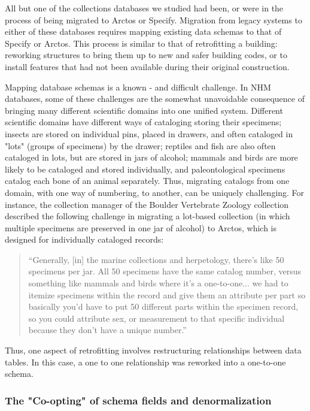 All but one of the collections databases we studied had been, or were in the process of being migrated to Arctos or Specify. Migration from legacy systems to either of these databases requires mapping existing data schemas to that of Specify or Arctos. This process is similar to that of retrofitting a building: reworking structures to bring them up to new and safer building codes, or to install features that had not been available during their original construction. 

Mapping database schemas is a known - and difficult challenge. In NHM databases, some of these challenges are the somewhat unavoidable consequence of bringing many different scientific domains into one unified system. Different scientific domains have different ways of cataloging storing their specimens; insects are stored on individual pins, placed in drawers, and often cataloged in "lots" (groups of specimens) by the drawer; reptiles and fish are also often cataloged in lots, but are stored in jars of alcohol; mammals and birds are more likely to be cataloged and stored individually, and paleontological specimens catalog each bone of an animal separately. Thus, migrating catalogs from one domain, with one way of numbering, to another, can be uniquely challenging. For instance, the collection manager of the Boulder Vertebrate Zoology collection described the following challenge in migrating a lot-based collection (in which multiple specimens are preserved in one jar of alcohol) to Arctos, which is designed for individually cataloged records:
\begin{quote}
“Generally, [in] the marine collections and herpetology, there's like 50 specimens per jar. All 50 specimens have the same catalog number, versus something like mammals and birds where it's a one-to-one... we had to itemize specimens within the record and give them an attribute per part so basically you'd have to put 50 different parts within the specimen record, so you could attribute sex, or measurement to that specific individual because they don't have a unique number.”
\end{quote}
Thus, one aspect of retrofitting involves restructuring relationships between data tables. In this case, a one to one relationship was reworked into a one-to-one schema.

\subsubsection{The "Co-opting" of schema fields and denormalization }

